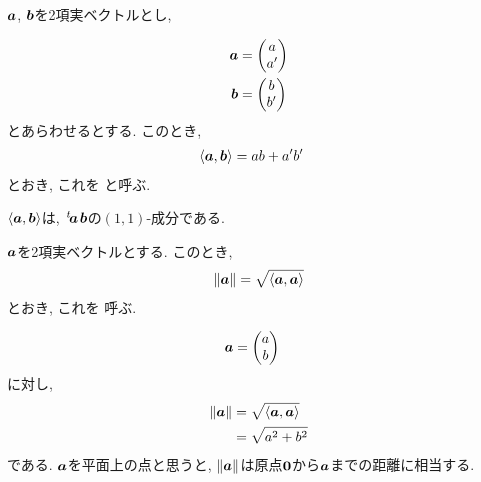 $\boldsymbol{a}$, $\boldsymbol{b}$を2項実ベクトルとし,
\begin{definition}
  \label{def:innnerprod}
  \begin{align*}
    \boldsymbol{a}&=\begin{pmatrix}a\\a'\end{pmatrix}\\
    \boldsymbol{b}&=\begin{pmatrix}b\\b'\end{pmatrix}    
  \end{align*}
  とあらわせるとする.
  このとき,
  \begin{align*}
    \Braket{\boldsymbol{a},\boldsymbol{b}}&=ab+a'b'
  \end{align*}
  とおき, これを
  \addindex{$\langle\aaa,\bbb\rangle$}%
  と呼ぶ.
\end{definition}
\begin{remark}
  $\Braket{\boldsymbol{a},\boldsymbol{b}}$は,
  ${\left.^{t}\!\boldsymbol{a}\right.}\boldsymbol{b}$の$(1,1)$-成分である.
\end{remark}

\begin{definition}
  \label{def:norm}
  $\boldsymbol{a}$を2項実ベクトルとする.
  このとき,
  \begin{align*}
   \|\boldsymbol{a}\| =\sqrt{\Braket{\boldsymbol{a},\boldsymbol{a}}}
  \end{align*}
  とおき, これを
  呼ぶ.
\end{definition}
\begin{remark}
  \begin{align*}
    \boldsymbol{a}&=\begin{pmatrix}a\\b\end{pmatrix}
  \end{align*}
  に対し,
  \begin{align*}
    \|\boldsymbol{a}\| &=\sqrt{\Braket{\boldsymbol{a},\boldsymbol{a}}}\\
    &=\sqrt{a^2+b^2}
  \end{align*}
  である.
  $\boldsymbol{a}$を平面上の点と思うと,
  $\|\boldsymbol{a}\|$は原点$\boldsymbol{0}$から$\boldsymbol{a}$までの距離に相当する.
\end{remark}


